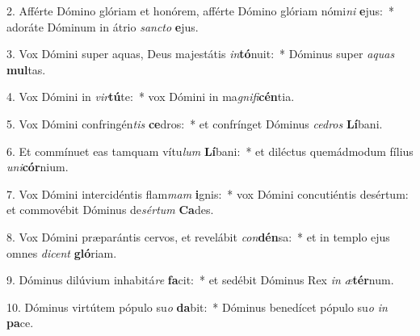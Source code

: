 2. Afférte Dómino glóriam et honórem, afférte Dómino glóriam nómi\textit{ni} \textbf{e}jus:~*  adoráte Dóminum in átrio \textit{sanc}\textit{to} \textbf{e}jus.\

3. Vox Dómini super aquas, Deus majestátis \textit{in}\textbf{tó}nuit:~*  Dóminus super \textit{a}\textit{quas} \textbf{mul}tas.\

4. Vox Dómini in \textit{vir}\textbf{tú}te:~*  vox Dómini in ma\textit{gni}\textit{fi}\textbf{cén}tia.\

5. Vox Dómini confringén\textit{tis} \textbf{ce}dros:~*  et confrínget Dóminus \textit{ce}\textit{dros} \textbf{Lí}bani.\

6. Et commínuet eas tamquam vítu\textit{lum} \textbf{Lí}bani:~*  et diléctus quemádmodum fílius \textit{u}\textit{ni}\textbf{cór}nium.\

7. Vox Dómini intercidéntis flam\textit{mam} \textbf{i}gnis:~*  vox Dómini concutiéntis desértum: et commovébit Dóminus de\textit{sér}\textit{tum} \textbf{Ca}des.\

8. Vox Dómini præparántis cervos, et revelábit \textit{con}\textbf{dén}sa:~*  et in templo ejus omnes \textit{di}\textit{cent} \textbf{gló}riam.\

9. Dóminus dilúvium inhabitá\textit{re} \textbf{fa}cit:~*  et sedébit Dóminus Rex \textit{in} \textit{æ}\textbf{tér}num.\

10. Dóminus virtútem pópulo su\textit{o} \textbf{da}bit:~*  Dóminus benedícet pópulo su\textit{o} \textit{in} \textbf{pa}ce.\

